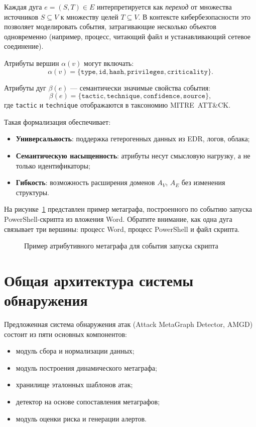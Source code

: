 Каждая дуга $e = (S, T) \in E$ интерпретируется как \textit{переход} от множества источников $S \subseteq V$ к множеству целей $T \subseteq V$. В контексте кибербезопасности это позволяет моделировать события, затрагивающие несколько объектов одновременно (например, процесс, читающий файл и устанавливающий сетевое соединение).

Атрибуты вершин $\alpha(v)$ могут включать:
\[
\alpha(v) = \{ \texttt{type}, \texttt{id}, \texttt{hash}, \texttt{privileges}, \texttt{criticality} \}.
\]

Атрибуты дуг $\beta(e)$ — семантически значимые свойства события:
\[
\beta(e) = \{ \texttt{tactic}, \texttt{technique}, \texttt{confidence}, \texttt{source} \},
\]
где \texttt{tactic} и \texttt{technique} отображаются в таксономию MITRE~ATT\&CK.

Такая формализация обеспечивает:
\begin{itemize}
    \item \textbf{Универсальность}: поддержка гетерогенных данных из EDR, логов, облака;
    \item \textbf{Семантическую насыщенность}: атрибуты несут смысловую нагрузку, а не только идентификаторы;
    \item \textbf{Гибкость}: возможность расширения доменов $A_V$, $A_E$ без изменения структуры.
\end{itemize}

На рисунке~\ref{fig:metagraph-formal} представлен пример метаграфа, построенного по событию запуска PowerShell-скрипта из вложения Word. Обратите внимание, как одна дуга связывает три вершины: процесс Word, процесс PowerShell и файл скрипта.

    \begin{figure}[ht]
        \centering
            
            \caption{Пример атрибутивного метаграфа для события запуска скрипта}
            \label{fig:metagraph-formal}
    \end{figure}

\section{Общая архитектура системы обнаружения}\label{sec:ch3/sect1}

Предложенная система обнаружения атак (Attack MetaGraph Detector, AMGD) состоит из пяти основных компонентов:

\noindent
\begin{itemize}
    \item модуль сбора и нормализации данных;
    \item модуль построения динамического метаграфа;
    \item хранилище эталонных шаблонов атак;
    \item детектор на основе сопоставления метаграфов;
    \item модуль оценки риска и генерации алертов.
\end{itemize}

